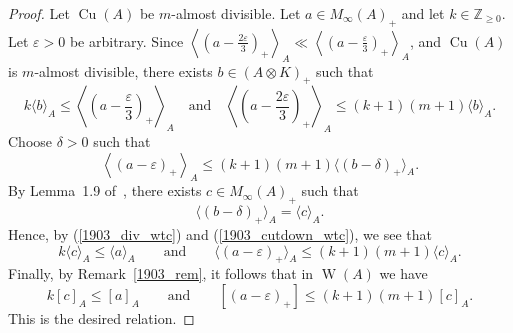 \documentclass[10pt]{amsart}
\numberwithin{equation}{section}
\theoremstyle{definition}
\newcommand{\ep}{\varepsilon}
\newcommand{\Nz}{{\mathbb{Z}}_{\geq 0}}
\newcommand{\Cu}{{\operatorname{Cu}}}
\newcommand{\W}{{\operatorname{W}}}
\newcommand{\andeqn}{\qquad {\mbox{and}} \qquad}
\newcommand{\cc}[1]{\langle #1 \rangle}
\newcommand{\inn}[1]{\left\langle #1 \right\rangle}
\begin{document}
\begin{proof}
Let $\Cu (A)$ be $m$-almost divisible.
Let $a \in M_{\infty}(A)_+$ and let $k \in \Nz$.
Let $\ep > 0$ be arbitrary.
Since
%
$\inn{\left( a - \frac{2 \ep}{3} \right)_+}_A
 \ll \inn{\left(a - \frac{\ep}{3} \right)_+}_A$,
%
and $\Cu (A)$ is $m$-almost divisible,
there exists $b \in (A \otimes K)_+$ such that
%
\begin{equation}\label{1903_div_wtc}
k \cc{b}_A \leq \inn{\left(a - \frac{\ep}{3} \right)_+}_A
\quad {\mbox{and}} \quad
\inn{\left(a - \frac{2 \ep}{3} \right)_+}_A \leq (k + 1) (m + 1) \cc{b}_A.
\end{equation}
%
Choose $\delta > 0$ such that
%
\begin{equation}\label{1903_cutdown_wtc}
\inn{\left(a - \ep\right)_+}_A \leq (k + 1) (m + 1) \cc{(b- \delta)_+}_A.
\end{equation}
%
By Lemma~1.9 of~\cite{Phl40},
there exists $c\in M_{\infty}(A)_+$ such that
\[
\cc{(b- \delta)_+}_A = \cc{c}_A.
\]
Hence, by (\ref{1903_div_wtc}) and (\ref{1903_cutdown_wtc}), we see that
%
\begin{equation*}
k \cc{c}_A \leq \cc{a}_A
\andeqn
\cc{(a - \ep)_+}_A \leq (k + 1) (m + 1) \cc{c}_A.
\end{equation*}
%
Finally, by Remark~\ref{1903_rem}, it follows that in $\W (A)$ we have
\[
k [c]_A \leq [a]_A
\andeqn
[(a - \ep)_+] \leq (k + 1) (m + 1) [c]_A.
\]
This is the desired relation.


\end{proof}
\end{document}
